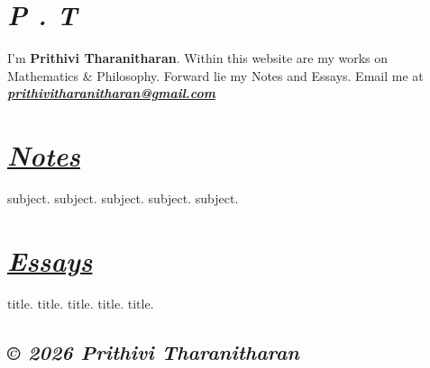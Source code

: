 \documentclass[12pt]{article}
\begin{document}
\section*{\textit{{P . T}}}
I'm \textbf{Prithivi Tharanitharan}. Within this website are my works on Mathematics
 \& Philosophy. Forward lie my Notes and Essays. 
 Email me at \href{mailto:prithivitharanitharan@gmail.com}{\textbf{\textit{prithivitharanitharan@gmail.com}}}

\section*{\href{/Notes/}{\textit{Notes}}}
subject. subject. subject. subject. subject.

\section*{\href{/Essays/}{\textit{Essays}}}
title. title. title. title. title.

\subsection*{\textit{© 2026 Prithivi Tharanitharan}}
\end{document}
